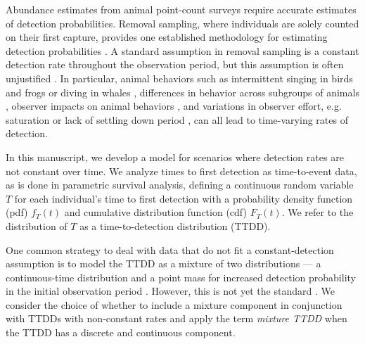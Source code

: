 \documentclass[12pt]{article}
\begin{document}
Abundance estimates from animal point-count surveys require accurate estimates of detection probabilities.  
Removal sampling, where individuals are solely counted on their first capture, provides one established methodology for estimating detection probabilities \citep{Farnsworth2002}.
A standard assumption in removal sampling is a constant detection rate throughout the observation period, but this assumption is often unjustified \citep{Alldredge2007, LeeMarsden2008}.  
In particular, animal behaviors such as intermittent singing in birds and frogs or diving in whales \citep{Scott2005, Diefenbach2007, Reidy2011}, differences in behavior across subgroups of animals \citep{Otis1978, Farnsworth2002}, observer impacts on animal behaviors \citep{McSheaRappole1997, Rosenstock2002, Alldredge2007}, and variations in observer effort, e.g. saturation or lack of settling down period \citep{Petit1995, LeeMarsden2008, Johnson2008}, can all lead to time-varying rates of detection.

In this manuscript, we develop a model for scenarios where detection rates are not constant over time. 
We analyze times to first detection as time-to-event data, as is done in parametric survival analysis, defining a continuous random variable $T$ for each individual's time to first detection with a probability density function (pdf) $f_T(t)$ and cumulative distribution function (cdf) $F_T(t)$.  
We refer to the distribution of $T$ as a time-to-detection distribution (TTDD).

One common strategy to deal with data that do not fit a constant-detection assumption is to model the TTDD as a mixture of two distributions --- a continuous-time distribution and a point mass for increased detection probability in the initial observation period \citep{Farnsworth2002, Farnsworth2005, EffordDawson2009, Etterson2009, Reidy2011}.
However, this is not yet the standard \citep{Solymos2013, Amundson2014, Reidy2016}. 
We consider the choice of whether to include a mixture component in conjunction with TTDDs with non-constant rates
and apply the term \emph{mixture TTDD} when the TTDD has a discrete and continuous component.
\end{document}
